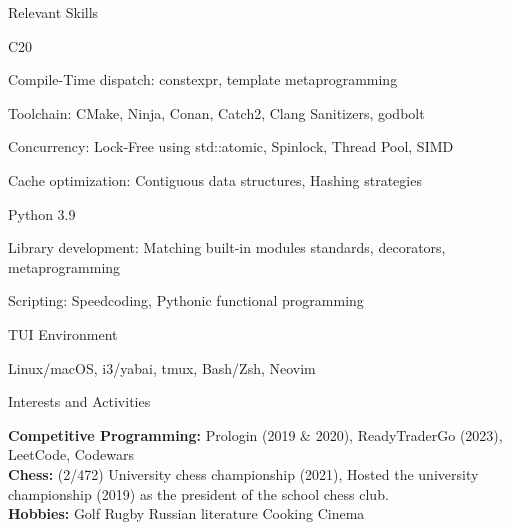 \documentclass[
	a4paper, %
	10pt, %
]{resume} %
\def\CC{{C\nolinebreak[4]\hspace{-.05em}\raisebox{.4ex}{\tiny\bf ++}}}
\begin{document}
\begin{rSection}{Relevant Skills}
	\begin{rSubsection}{\CC20}{}{}{}
    \item Compile-Time dispatch: constexpr, template metaprogramming
    \item Toolchain: CMake, Ninja, Conan, Catch2, Clang Sanitizers, godbolt
    \item Concurrency: Lock-Free using std::atomic, Spinlock, Thread Pool, SIMD
    \item Cache optimization: Contiguous data structures, Hashing strategies
	\end{rSubsection}
  \begin{rSubsection}{Python 3.9}{}{}{}
    \item Library development: Matching built-in modules standards, decorators, metaprogramming
    \item Scripting: Speedcoding, Pythonic functional programming
  \end{rSubsection}
  \begin{rSubsection}{TUI Environment}{}{}{}
    \item Linux/macOS, i3/yabai, tmux, Bash/Zsh, Neovim
  \end{rSubsection}
\end{rSection}


\begin{rSection}{Interests and Activities}

	\textbf{Competitive Programming:} Prologin (2019 \& 2020), ReadyTraderGo (2023), LeetCode, Codewars \\
	\textbf{Chess:} (2/472) University chess championship (2021), Hosted the university championship (2019) as the president of the school chess club.\\
  \textbf{Hobbies:} Golf  Rugby  Russian literature  Cooking  Cinema
\end{rSection}
\end{document}
